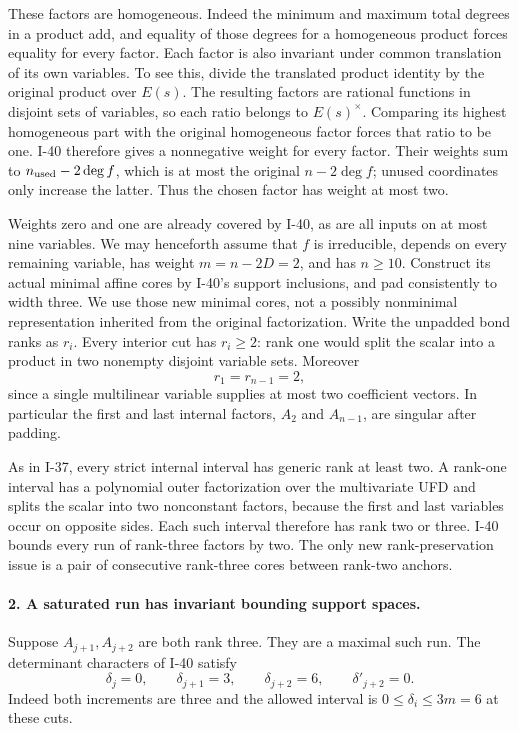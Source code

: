 These factors are homogeneous. Indeed the minimum and maximum
total degrees in a product add, and equality of those degrees
for a homogeneous product forces equality for every factor.
Each factor is also invariant under common translation of its
own variables. To see this, divide the translated product
identity by the original product over $E(s)$. The resulting
factors are rational functions in disjoint sets of variables,
so each ratio belongs to $E(s)^\times$. Comparing its highest
homogeneous part with the original homogeneous factor forces
that ratio to be one. I-40 therefore gives a nonnegative weight
for every factor. Their weights sum to $n_{\rm used}-2\deg f$,
which is at most the original $n-2\deg f$; unused coordinates
only increase the latter. Thus the chosen factor has weight
at most two.

Weights zero and one are already covered by I-40, as are all
inputs on at most nine variables. We may henceforth assume
that $f$ is irreducible, depends on every remaining variable,
has weight $m=n-2D=2$, and has $n\ge10$. Construct its actual
minimal affine cores by I-40's support inclusions, and pad
consistently to width three. We use those new minimal cores,
not a possibly nonminimal representation inherited from the
original factorization. Write the unpadded bond ranks as $r_i$.
Every interior cut has $r_i\ge2$: rank one would split the
scalar into a product in two nonempty disjoint variable sets.
Moreover
\[
 r_1=r_{n-1}=2,
 \tag{I.134}
\]
since a single multilinear variable supplies at most two
coefficient vectors. In particular the first and last internal
factors, $A_2$ and $A_{n-1}$, are singular after padding.

As in I-37, every strict internal interval has generic rank at
least two. A rank-one interval has a polynomial outer
factorization over the multivariate UFD and splits the scalar
into two nonconstant factors, because the first and last
variables occur on opposite sides. Each such interval therefore
has rank two or three. I-40 bounds every run of rank-three
factors by two. The only new rank-preservation issue is a pair
of consecutive rank-three cores between rank-two anchors.

\paragraph{2. A saturated run has invariant bounding support spaces.}
Suppose $A_{j+1},A_{j+2}$ are both rank three. They are a
maximal such run. The determinant characters of I-40 satisfy
\[
 \delta_j=0,\qquad \delta_{j+1}=3,
 \qquad\delta_{j+2}=6,
 \qquad\delta'_{j+2}=0.
 \tag{I.135}
\]
Indeed both increments are three and the allowed interval is
$0\le\delta_i\le3m=6$ at these cuts.


